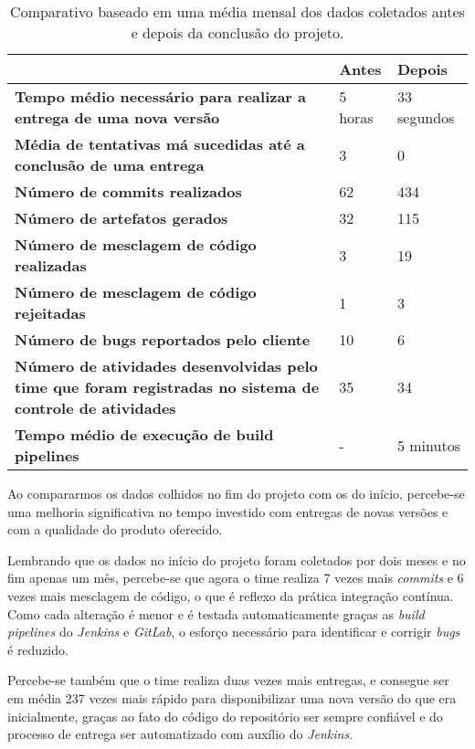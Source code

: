 \documentclass[
	12pt,				%
	openright,			%
	oneside,			%
	a4paper,			%
	english,			%
	french,				%
	spanish,			%
	brazil,				%
	]{abntex2}
\begin{document}
\begin{table}[htb]
	\caption{Comparativo baseado em uma média mensal dos dados coletados antes e depois da conclusão do projeto.}
	
	\label{tab-comparativo}	
	\begin{tabular}{p{7.85cm}|p{3.20cm}|p{3.20cm}}
		& \textbf{Antes} & \textbf{Depois}  \\
		\hline
		\textbf{Tempo médio necessário para realizar a entrega de uma nova versão} & 5 horas & 33 segundos \\
		\hline
		\textbf{Média de tentativas má sucedidas até a conclusão de uma entrega} & 3 & 0 \\
		\hline
		\textbf{Número de commits realizados} & 62 & 434 \\
		\hline
		\textbf{Número de artefatos gerados} & 32 & 115 \\
		\hline
		\textbf{Número de mesclagem de código realizadas} & 3 & 19 \\
		\hline
		\textbf{Número de mesclagem de código rejeitadas} & 1 & 3 \\
		\hline
		\textbf{Número de bugs reportados pelo cliente} & 10 & 6 \\
		\hline
		\textbf{Número de atividades desenvolvidas pelo time que foram registradas no sistema de controle de atividades} & 35 & 34 \\
		\hline
		\textbf{Tempo médio de execução de build pipelines} & - & 5 minutos \\
	\end{tabular}
\end{table}

Ao compararmos os dados colhidos no fim do projeto com os do início, percebe-se uma melhoria significativa no tempo investido com entregas de novas versões e com a qualidade do produto oferecido.

Lembrando que os dados no início do projeto foram coletados por dois meses e no fim apenas um mês, percebe-se que agora o time realiza 7 vezes mais \textit{commits} e 6 vezes mais mesclagem de código, o que é reflexo da prática integração contínua. Como cada alteração é menor e é testada automaticamente graças as \textit{build pipelines} do \textit{Jenkins} e \textit{GitLab}, o esforço necessário para identificar e corrigir \textit{bugs} é reduzido.

Percebe-se também que o time realiza duas vezes mais entregas, e consegue ser em média 237 vezes mais rápido para disponibilizar uma nova versão do que era inicialmente, graças ao fato do código do repositório ser sempre confiável e do processo de entrega ser automatizado com auxílio do \textit{Jenkins}.
\end{document}
